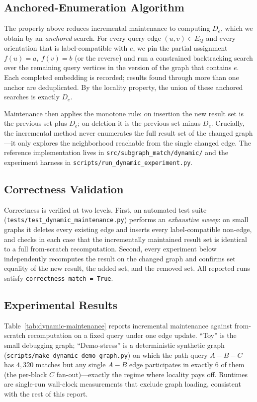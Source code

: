 \subsection{Anchored-Enumeration Algorithm}

The property above reduces incremental maintenance to computing $D_e$, which we obtain by an \emph{anchored} search. For every query edge $(u,v) \in E_Q$ and every orientation that is label-compatible with $e$, we pin the partial assignment $f(u) = a,\ f(v) = b$ (or the reverse) and run a constrained backtracking search over the remaining query vertices in the version of the graph that contains $e$. Each completed embedding is recorded; results found through more than one anchor are deduplicated. By the locality property, the union of these anchored searches is exactly $D_e$.

Maintenance then applies the monotone rule: on insertion the new result set is the previous set plus $D_e$; on deletion it is the previous set minus $D_e$. Crucially, the incremental method never enumerates the full result set of the changed graph---it only explores the neighborhood reachable from the single changed edge. The reference implementation lives in \texttt{src/subgraph\_match/dynamic/} and the experiment harness in \texttt{scripts/run\_dynamic\_experiment.py}.

\subsection{Correctness Validation}

Correctness is verified at two levels. First, an automated test suite (\texttt{tests/test\_dynamic\_maintenance.py}) performs an \emph{exhaustive sweep}: on small graphs it deletes every existing edge and inserts every label-compatible non-edge, and checks in each case that the incrementally maintained result set is identical to a full from-scratch recomputation. Second, every experiment below independently recomputes the result on the changed graph and confirms set equality of the new result, the added set, and the removed set. All reported runs satisfy \texttt{correctness\_match = True}.

\subsection{Experimental Results}

Table~\ref{tab:dynamic-maintenance} reports incremental maintenance against from-scratch recomputation on a fixed query under one edge update. ``Toy'' is the small debugging graph; ``Demo-stress'' is a deterministic synthetic graph (\texttt{scripts/make\_dynamic\_demo\_graph.py}) on which the path query $A\!-\!B\!-\!C$ has $4{,}320$ matches but any single $A\!-\!B$ edge participates in exactly $6$ of them (the per-block $C$ fan-out)---exactly the regime where locality pays off. Runtimes are single-run wall-clock measurements that exclude graph loading, consistent with the rest of this report.

